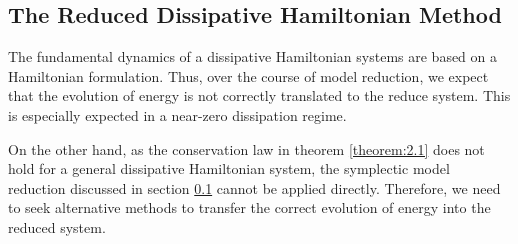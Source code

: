 \subsection{The Reduced Dissipative Hamiltonian Method}

The fundamental dynamics of a dissipative Hamiltonian systems are based on a Hamiltonian formulation. Thus, over the course of model reduction, we expect that the evolution of energy is not correctly translated to the reduce system. This is especially expected in a near-zero dissipation regime.

On the other hand, as the conservation law in theorem \ref{theorem:2.1} does not hold for a general dissipative Hamiltonian system, the symplectic model reduction discussed in section \ref{} cannot be applied directly. Therefore, we need to seek alternative methods to transfer the correct evolution of energy into the reduced system.

